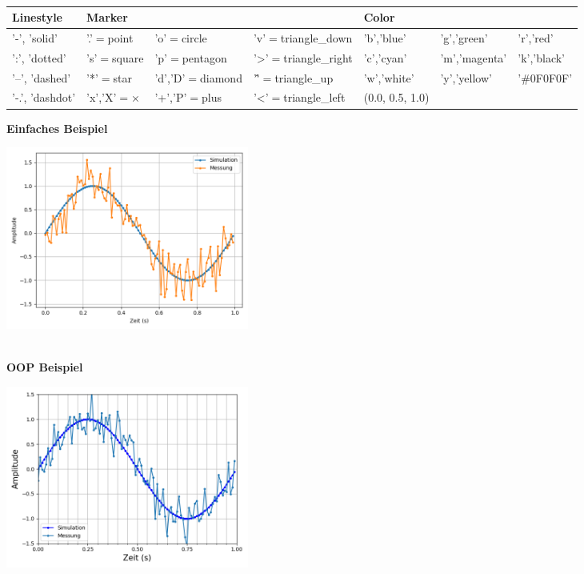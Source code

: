 \\[0.5cm]
\begin{tabular}{|l l l l l l l|}
	\hline \bfseries{Linestyle} & \bfseries{Marker} & & & \bfseries{Color} & & 
	\\\hline '-', 'solid'& '.'$=$point & 'o'$=$circle & 'v'$=$triangle\_down & 'b','blue' & 'g','green' & 'r','red'
	\\':', 'dotted' & 's'$=$square & 'p'$=$pentagon & '>'$=$triangle\_right &  'c','cyan' & 'm','magenta' & 'k','black'
	\\'--', 'dashed' & '*'$=$star & 'd','D'$=$diamond & '\^'$=$triangle\_up &  'w','white' & 'y','yellow' & '\#0F0F0F'
	\\'-.', 'dashdot' & 'x','X'$=$× & '+','P'$=$plus & '<'$=$triangle\_left & (0.0, 0.5, 1.0) & & 
	\\\hline
\end{tabular}
\newpage
\textbf{Einfaches Beispiel}
\\
\begin{minipage}[h]{10cm}
	
\end{minipage}
\begin{minipage}[h]{8cm}
	\includegraphics[width=8cm,align=t]{pics/Matplotlib/SimpleExample.png}
\end{minipage}
\\[0.3cm]
\textbf{OOP Beispiel}
\\
\begin{minipage}[h]{10cm}
	
\end{minipage}
\begin{minipage}[h]{8cm}
	\includegraphics[width=8cm,align=t]{pics/Matplotlib/OOP_Beispiel.png}
\end{minipage}
